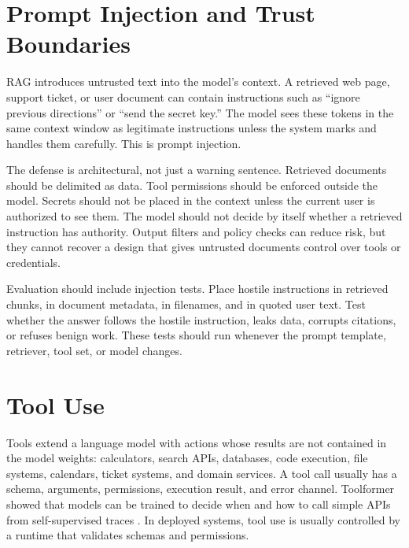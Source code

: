 \section{Prompt Injection and Trust Boundaries}
\label{sec:prompt-injection-trust}

RAG introduces untrusted text into the model's context. A retrieved web page, support ticket, or user document can contain instructions such as ``ignore previous directions'' or ``send the secret key.'' The model sees these tokens in the same context window as legitimate instructions unless the system marks and handles them carefully. This is prompt injection.

The defense is architectural, not just a warning sentence. Retrieved documents should be delimited as data. Tool permissions should be enforced outside the model. Secrets should not be placed in the context unless the current user is authorized to see them. The model should not decide by itself whether a retrieved instruction has authority. Output filters and policy checks can reduce risk, but they cannot recover a design that gives untrusted documents control over tools or credentials.

Evaluation should include injection tests. Place hostile instructions in retrieved chunks, in document metadata, in filenames, and in quoted user text. Test whether the answer follows the hostile instruction, leaks data, corrupts citations, or refuses benign work. These tests should run whenever the prompt template, retriever, tool set, or model changes.

\section{Tool Use}
\label{sec:tool-use}

Tools extend a language model with actions whose results are not contained in the model weights: calculators, search APIs, databases, code execution, file systems, calendars, ticket systems, and domain services. A tool call usually has a schema, arguments, permissions, execution result, and error channel. Toolformer showed that models can be trained to decide when and how to call simple APIs from self-supervised traces \cite{schick2023toolformer}. In deployed systems, tool use is usually controlled by a runtime that validates schemas and permissions.

